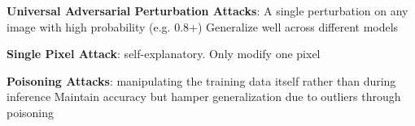 \textbf{Universal Adversarial Perturbation Attacks}: 
A single perturbation on any image with high probability (e.g. 0.8+)
Generalize well across different models

\textbf{Single Pixel Attack}:
self-explanatory. Only modify one pixel

\textbf{Poisoning Attacks}:
manipulating the training data itself rather than during inference
Maintain accuracy but hamper generalization due to outliers through poisoning

